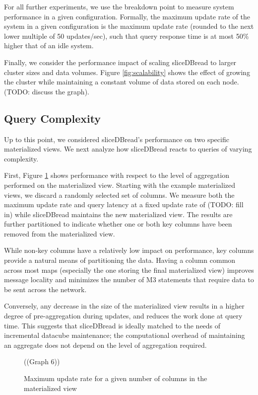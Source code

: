 For all further experiments, we use the breakdown point to measure system performance in a given configuration.  Formally, the maximum update rate of the system in a given configuration is the maximum update rate (rounded to the next lower multiple of 50 updates/sec), such that query response time is at most 50\% higher that of an idle system.

Finally, we consider the performance impact of scaling sliceDBread to larger cluster sizes and data volumes.  Figure \ref{fig:scalability} shows the effect of growing the cluster while maintaining a constant volume of data stored on each node.  (TODO: discuss the graph).

\subsection{Query Complexity}
\label{sec:exp:complexity}
Up to this point, we considered sliceDBread's performance on two specific materialized views.  We next analyze how sliceDBread reacts to queries of varying complexity.  

First, Figure \ref{fig:scalinggroupby} shows performance with respect to the level of aggregation performed on the materialized view.  Starting with the example materialized views, we discard a randomly selected set of columns.  We measure both the maximum update rate and query latency at a fixed update rate of (TODO: fill in) while sliceDBread maintains the new materialized view.  The results are further partitioned to indicate whether one or both key columns have been removed from the materialized view.

While non-key columns have a relatively low impact on performance, key columns provide a natural means of partitioning the data.  Having a column common across most maps (especially the one storing the final materialized view) improves message locality and minimizes the number of M3 statements that require data to be sent across the network.

Conversely, any decrease in the size of the materialized view results in a higher degree of pre-aggregation during updates, and reduces the work done at query time.  This suggests that sliceDBread is ideally matched to the needs of incremental datacube maintenance; the computational overhead of maintaining an aggregate does not depend on the level of aggregation required.

\begin{figure}
((Graph 6))
\caption{Maximum update rate for a given number of columns in the materialized view}
\label{fig:scalinggroupby}
\end{figure}

